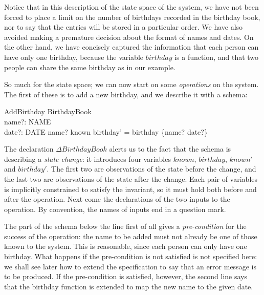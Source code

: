 \documentclass[12pt]{article}
\begin{document}
Notice that in this description of the state space of the
system, we have not been forced to place a limit on the
number of birthdays recorded in the birthday book, 
nor  to say that the
entries will be stored in a particular order. We have also
avoided making a premature decision about the format of
names and dates. On the other hand, we have concisely
captured the information that each person can have only one
birthday, because the variable $birthday$ is a function, and
that two people can share the same birthday as in our
example.

So much for the state space; we can now start on some {\em
operations\/} on the system. The first of these is to add a
new birthday, and we describe it with a schema:
\begin{schema}{AddBirthday}
     \Delta BirthdayBook \\
     name?: NAME \\
     date?: DATE
\where
     name? \notin known
\also
     birthday' = birthday \cup \{name? \mapsto date?\}
\end{schema}
The declaration $\Delta BirthdayBook$ alerts us to the fact
that the schema is describing a {\em state change}: it
introduces four variables $known$, $birthday$, $known'$ and
$birthday'$. The first two are observations of the state before the
change, and the last two are observations of the state after the
change. Each pair of variables is implicitly constrained to satisfy
the invariant, so it must hold both before and after the operation.
Next come the declarations of the two inputs to the operation.
By convention, the names of inputs end in a question mark.

The part of the schema below the line first of all gives a
{\em pre-condition\/} for the success of the operation: the
name to be added must not already be one of those known to
the system. This is reasonable, since each person can only
have one birthday. What happens if the pre-condition is
not satisfied is not specified here: we shall see later how
to extend the specification to say that an error message is
to be produced. If the pre-condition is satisfied, however, the
second line says that the birthday function is extended to
map the new name to the given date.
\end{document}
